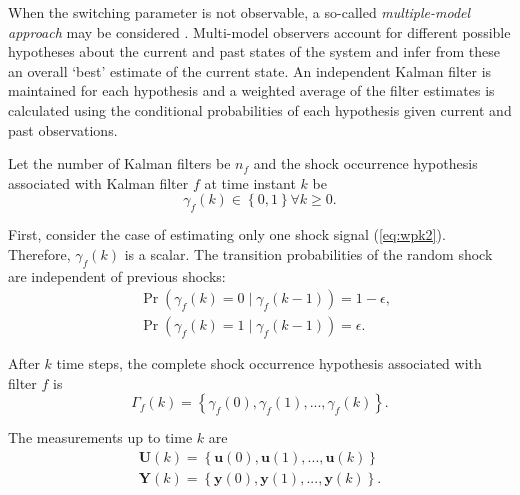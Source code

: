 When the switching parameter is not observable, a so-called \textit{multiple-model approach} may be considered \citep{buxbaum_recursive_1970, jaffer_estimation_1971}. Multi-model observers account for different possible hypotheses about the current and past states of the system and infer from these an overall `best' estimate of the current state. An independent Kalman filter is maintained for each hypothesis and a weighted average of the filter estimates is calculated using the conditional probabilities of each hypothesis given current and past observations.

Let the number of Kalman filters be $n_f$ and the shock occurrence hypothesis associated with Kalman filter $f$ at time instant $k$ be
\begin{equation} \label{eq:gammak}
	\gamma_{f}(k) \in \left\{0, 1 \right\} \forall{k \ge 0}.
\end{equation}

First, consider the case of estimating only one shock signal (\ref{eq:wpk2}). Therefore, $\gamma_{f}(k)$ is a scalar. The transition probabilities of the random shock are independent of previous shocks:
\begin{equation} \label{eq:Pr_gammak_given_gammakm1}
	\begin{aligned}
		& \Pr\left(\gamma_{f}(k)=0 \mid \gamma_{f}(k-1)\right) = 1-\epsilon, \\
		& \Pr\left(\gamma_{f}(k)=1 \mid \gamma_{f}(k-1)\right) = \epsilon.
	\end{aligned}
\end{equation}

After $k$ time steps, the complete shock occurrence hypothesis associated with filter $f$ is
\begin{equation} \label{eq:Gammak}
	\Gamma_f(k) = \left\{\gamma_f(0), \gamma_f(1), ..., \gamma_f(k) \right\}.
\end{equation}

The measurements up to time $k$ are
\begin{equation} \label{eq:Uk_Yk}
	\begin{aligned}
		\mathbf{U}(k)=\left\{\mathbf{u}(0), \mathbf{u}(1), ..., \mathbf{u}(k) \right\} \\
		\mathbf{Y}(k)=\left\{\mathbf{y}(0), \mathbf{y}(1), ..., \mathbf{y}(k) \right\}.
	\end{aligned}
\end{equation}

